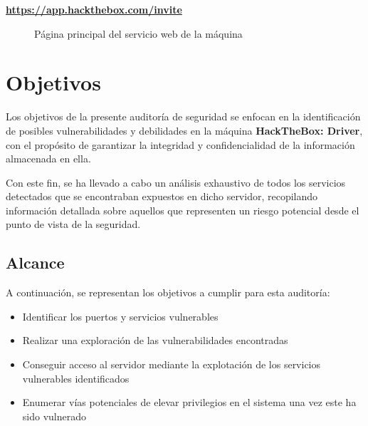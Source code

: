 \documentclass[a4paper]{article} %
\newcommand{\machineName}{HackTheBox: Driver} %
\begin{document}
        \vspace{0.2cm}

        \begin{tcolorbox}[enhanced,attach boxed title to top center={yshift=-3mm,yshifttext=-1mm},
        colback=blue!5!white,colframe=blue!75!black,colbacktitle=red!80!black,
        title=Dirección URL,fonttitle=\bfseries,
        boxed title style={size=small,colframe=red!50!black} ]
        \centering
        \href{https://app.hackthebox.com/invite}{\textbf{\color{bluePortada}https://app.hackthebox.com/invite}}
        \end{tcolorbox}

        \vspace{0.5cm}

        \begin{figure}[h]
                \centering
                \setlength{\fboxrule}{0.8pt}
                \caption{Página principal del servicio web de la máquina}
        \end{figure}

        \section{Objetivos}

        Los objetivos de la presente auditoría de seguridad se enfocan en la identificación de posibles vulnerabilidades y debilidades en la máquina \textbf{\color{bluePortada}\machineName}, con el propósito de garantizar la integridad y confidencialidad de la información almacenada en ella.

        Con este fin, se ha llevado a cabo un análisis exhaustivo de todos los servicios detectados que se encontraban expuestos en dicho servidor, recopilando información detallada sobre aquellos que representen un riesgo potencial desde el punto de vista de la seguridad.

        \clearpage
        \subsection{Alcance}

        A continuación, se representan los objetivos a cumplir para esta auditoría:

	\begin{itemize}
                \item Identificar los puertos y servicios vulnerables
                \item Realizar una exploración de las vulnerabilidades encontradas
                \item Conseguir acceso al servidor mediante la explotación de los servicios vulnerables identificados
                \item Enumerar vías potenciales de elevar privilegios en el sistema una vez este ha sido vulnerado
        \end{itemize}
\end{document}
